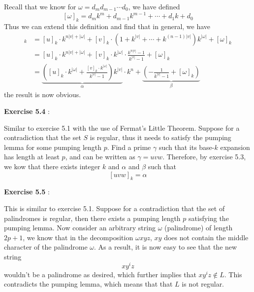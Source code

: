 \documentclass{article}
\newenvironment{solution}[1][\proofname]{
    \proof[\textbf{Solution:}] \renewcommand{\qedsymbol}{$\bell$}
}{\endproof}
\begin{document}
\begin{solution}


    Recall that we know for $\omega = d_m d_{m-1} \cdots d_0$, we have defined 
    \[ [\omega]_k = d_m k^m + d_{m-1} k^{m-1} + \cdots + d_1 k + d_0 \]
    Thus we can extend this definition and find that in general, we have 
    \begin{align*}
        [u v^n \omega]_k 
        & = [u]_k \cdot k^{n|v| + |\omega|} + [v]_k \cdot (1 + k^{|v|} + \cdots + k^{(n-1)|v|}) k^{|\omega|} + [\omega]_k \\ 
        & = [u]_k \cdot k^{n|v| + |\omega|} + [v]_k \cdot k^{|\omega|} \cdot \frac{k^{n|v|} - 1}{k^{|v|} - 1} + [\omega]_k \\ 
        & = \underbrace{ \left( [u]_k \cdot k^{|\omega|} + \frac{[v]_k \cdot k^{|\omega|}}{k^{|v|} - 1} \right) k^{|v|} }_{\alpha} \cdot k^{n} + \underbrace{ \left( - \frac{1}{k^{|v|} - 1} + [\omega]_k \right) }_{\beta} 
    \end{align*}
    the result is now obvious. 
\end{solution}

\noindent \textbf{Exercise 5.4} \label{exercise5.4}: 

\begin{solution}
    Similar to exercise 5.1 with the use of Fermat's Little Theorem. Suppose for a contradiction that the set $S$ is regular, thus it needs to satisfy the pumping lemma for some pumping length $p$. Find a prime $\gamma$ such that its base-$k$ expansion has length at least $p$, and can be written as $\gamma = uvw$. Therefore, by exercise 5.3, we kow that there exists integer $k$ and $\alpha$ and $\beta$ such that 
    \[ [uvw]_k = \alpha  \]
\end{solution}

\noindent \textbf{Exercise 5.5} \label{exercise5.5}: 

\begin{solution}
    This is similar to exercise 5.1. Suppose for a contradiction that the set of palindromes is regular, then there exists a pumping length $p$ satisfying the pumping lemma. Now consider an arbitrary string $\omega$ (palindrome) of length $2p + 1$, we know that in the decomposition $\omega xyz$, $xy$ does not contain the middle character of the palindrome $\omega$. As a result, it is now easy to see that the new string 
    \[ x y^i z \]
    wouldn't be a palindrome as desired, which further implies that $x y^i z \notin L$. This contradicts the pumping lemma, which means that that $L$ is not regular. 
\end{solution}
\end{document}
